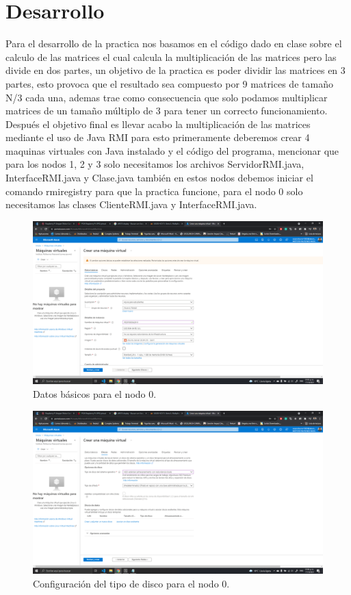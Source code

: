 \documentclass[11pt]{article}
\begin{document}
	\section{Desarrollo}
Para el desarrollo de la practica nos basamos en el código dado en clase sobre el calculo de las matrices el cual calcula la multiplicación de las matrices pero las divide en dos partes, un objetivo de la practica es poder dividir las matrices en 3 partes, esto provoca que el resultado sea compuesto por 9 matrices de tamaño N/3 cada una, ademas trae como consecuencia que solo podamos multiplicar matrices de un tamaño múltiplo de 3 para tener un correcto funcionamiento. Después el objetivo final es llevar acabo la multiplicación de las matrices mediante el uso de Java RMI para esto primeramente deberemos crear 4 maquinas virtuales con Java instalado y el código del programa, mencionar que para los nodos 1, 2 y 3 solo necesitamos los archivos ServidorRMI.java, InterfaceRMI.java y Clase.java también en estos nodos debemos iniciar el comando rmiregistry para que la practica funcione, para el nodo 0 solo necesitamos las clases ClienteRMI.java y InterfaceRMI.java.
		\begin{figure}[H]
			\centering
			\includegraphics[scale=0.34]{resources/datosbasicos.png}
			\caption{Datos básicos para el nodo 0. }\label{fig:picture}
		\end{figure}
		\begin{figure}[H]
			\centering
			\includegraphics[scale=0.34]{resources/datosdisco.png}
			\caption{Configuración del tipo de disco para el nodo 0. }\label{fig:picture}
		\end{figure}
\end{document}
